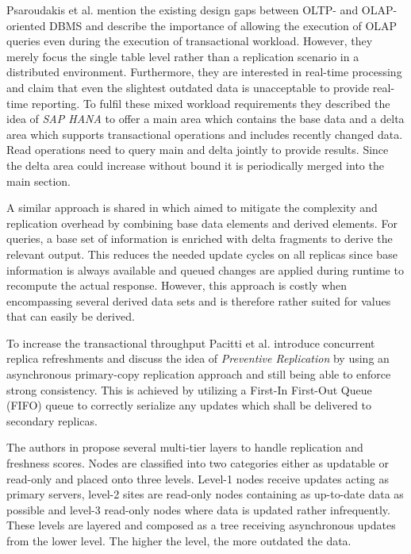 Psaroudakis et al. \cite{psaroudakis:2015} mention the existing design gaps between OLTP- and OLAP-oriented DBMS and describe the importance of allowing the execution of
OLAP queries even during the execution of transactional workload. However, they merely focus the single table level rather than a replication scenario in a distributed 
environment. Furthermore, they are interested in real-time processing and claim that even the slightest outdated data is unacceptable to provide real-time reporting.
To fulfil these mixed workload requirements they described the idea of \emph{SAP HANA} to offer a main area which contains the base data and a delta area 
which supports transactional operations and includes recently changed data. Read operations need to query main and delta jointly to provide results. 
Since the delta area could increase without bound it is periodically merged into the main section. 


A similar approach is shared in \cite{wei:2004} which aimed to mitigate the complexity and replication overhead by combining base data elements and derived elements.
For queries, a base set of information is enriched with delta fragments to derive the relevant output.
This reduces the needed update cycles on all replicas since base information is always available and queued changes are applied during runtime to recompute 
the actual response. However, this approach is costly when encompassing several derived data sets and is therefore rather suited for values that can 
easily be derived. 


To increase the transactional throughput Pacitti et al. \cite{pacitti:2005} introduce concurrent replica refreshments and discuss the idea of \emph{Preventive Replication} 
by using an asynchronous primary-copy replication approach and still being able to enforce strong consistency. This is achieved by utilizing a First-In First-Out Queue (FIFO) queue 
to correctly serialize any updates which shall be delivered to secondary replicas.

The authors in \cite{voicu:2010} propose several multi-tier layers to handle replication and freshness scores. Nodes are classified into two categories either as updatable or read-only
and placed onto three levels.
Level-1 nodes receive updates acting as primary servers, level-2 sites are read-only nodes containing as up-to-date data as possible and level-3 read-only nodes
where data is updated rather infrequently. These levels are layered and composed as a tree receiving asynchronous updates from the lower level. 
The higher the level, the more outdated the data.

